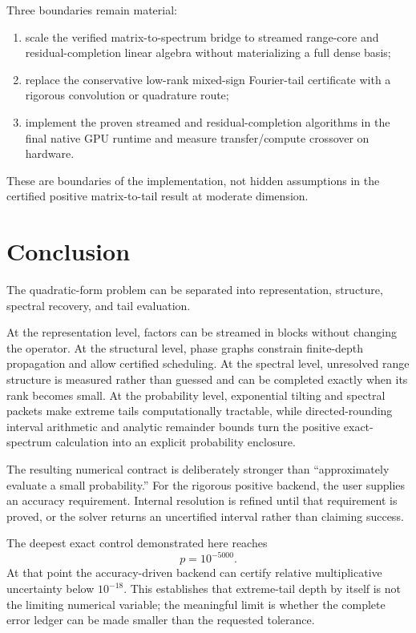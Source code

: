 \documentclass[11pt]{article}
\theoremstyle{definition}
\theoremstyle{remark}
\begin{document}
Three boundaries remain material:

\begin{enumerate}
\item scale the verified matrix-to-spectrum bridge to streamed range-core and
residual-completion linear algebra without materializing a full dense basis;
\item replace the conservative low-rank mixed-sign Fourier-tail certificate
with a rigorous convolution or quadrature route;
\item implement the proven streamed and residual-completion algorithms in the
final native GPU runtime and measure transfer/compute crossover on hardware.
\end{enumerate}

These are boundaries of the implementation, not hidden assumptions in the
certified positive matrix-to-tail result at moderate dimension.


\section{Conclusion}

The quadratic-form problem can be separated into representation, structure,
spectral recovery, and tail evaluation.

At the representation level, factors can be streamed in blocks without
changing the operator.  At the structural level, phase graphs constrain
finite-depth propagation and allow certified scheduling.  At the spectral
level, unresolved range structure is measured rather than guessed and can be
completed exactly when its rank becomes small.  At the probability level,
exponential tilting and spectral packets make extreme tails computationally
tractable, while directed-rounding interval arithmetic and analytic remainder
bounds turn the positive exact-spectrum calculation into an explicit
probability enclosure.

The resulting numerical contract is deliberately stronger than
``approximately evaluate a small probability.''  For the rigorous positive
backend, the user supplies an accuracy requirement.  Internal resolution is
refined until that requirement is proved, or the solver returns an
uncertified interval rather than claiming success.

The deepest exact control demonstrated here reaches
\[
p=10^{-5000}.
\]
At that point the accuracy-driven backend can certify relative multiplicative
uncertainty below \(10^{-18}\).  This establishes that extreme-tail depth by
itself is not the limiting numerical variable; the meaningful limit is whether
the complete error ledger can be made smaller than the requested tolerance.
\end{document}

